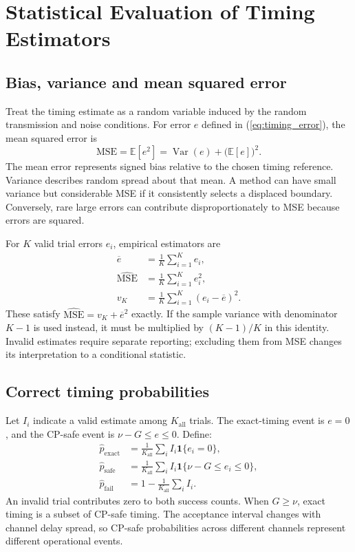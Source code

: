 \section{Statistical Evaluation of Timing Estimators}
\subsection{Bias, variance and mean squared error}
Treat the timing estimate as a random variable induced by the random transmission and noise conditions. For error $e$ defined in (\ref{eq:timing_error}), the mean squared error is
\begin{equation}
 \mathrm{MSE}=\mathbb{E}[e^2]=\operatorname{Var}(e)+\bigl(\mathbb{E}[e]\bigr)^2.
 \label{eq:mse_decomposition}
\end{equation}
The mean error represents signed bias relative to the chosen timing reference. Variance describes random spread about that mean. A method can have small variance but considerable MSE if it consistently selects a displaced boundary. Conversely, rare large errors can contribute disproportionately to MSE because errors are squared.

For $K$ valid trial errors $e_i$, empirical estimators are
\begin{align}
 \overline e&=\frac{1}{K}\sum_{i=1}^{K}e_i,\\
 \widehat{\mathrm{MSE}}&=\frac{1}{K}\sum_{i=1}^{K}e_i^2,\\
 v_K&=\frac{1}{K}\sum_{i=1}^{K}(e_i-\overline e)^2.
\end{align}
These satisfy $\widehat{\mathrm{MSE}}=v_K+\overline e^2$ exactly. If the sample variance with denominator $K-1$ is used instead, it must be multiplied by $(K-1)/K$ in this identity. Invalid estimates require separate reporting; excluding them from MSE changes its interpretation to a conditional statistic.

\subsection{Correct timing probabilities}
Let $I_i$ indicate a valid estimate among
$K_{\mathrm{all}}$ trials. The exact-timing event
is $e=0$, and the CP-safe event is
$\nu-G\leq e\leq0$. Define:
\begin{align}
 \widehat p_{\mathrm{exact}}&=\frac{1}{K_{\mathrm{all}}}\sum_i I_i\mathbf{1}\{e_i=0\},\\
 \widehat p_{\mathrm{safe}}&=\frac{1}{K_{\mathrm{all}}}\sum_i I_i\mathbf{1}\{\nu-G\leq e_i\leq0\},\\
 \widehat p_{\mathrm{fail}}&=1-\frac{1}{K_{\mathrm{all}}}\sum_i I_i.
\end{align}
An invalid trial contributes zero to both success counts. When $G\geq\nu$, exact timing is a subset of CP-safe timing. The acceptance interval changes with channel delay spread, so CP-safe probabilities across different channels represent different operational events.

